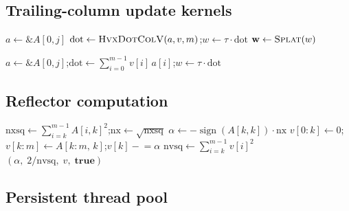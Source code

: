 \documentclass[11pt]{article}
\newcommand{\vt}{v^{\!\top}}
\begin{document}
\subsection{Trailing-column update kernels}

\begin{algorithm}[H]
\caption{\textsc{ApplyColHvx}$(A, v, \tau, j, m)$ --- $A[:,j] \mathrel{-}= \tau(\vt A[:,j])\,v$}
$a \gets \&A[0,j]$ 
$\text{dot} \gets \textsc{HvxDotColV}(a, v, m)$;\quad $w \gets \tau\cdot\text{dot}$\;
$\mathbf{w} \gets \textsc{Splat}(w)$ 
\end{algorithm}

\begin{algorithm}[H]
\caption{\textsc{ApplyColScalar}$(A, v, \tau, j, m)$ --- identical math, no HVX (fallback)}
$a \gets \&A[0,j]$;\quad $\text{dot} \gets \sum_{i=0}^{m-1} v[i]\,a[i]$;\quad $w \gets \tau\cdot\text{dot}$\;
\lForEach{$i \in [0,m)$}{$a[i] \mathrel{-}= w\,v[i]$}
\end{algorithm}

\subsection{Reflector computation}

\begin{algorithm}[H]
\caption{\textsc{ComputeReflector}$(A, m, k) \to (\alpha, \tau, v, \mathrm{valid})$}
$\mathrm{nxsq} \gets \sum_{i=k}^{m-1} A[i,k]^2$;\quad $\mathrm{nx} \gets \sqrt{\mathrm{nxsq}}$\;
$\alpha \gets -\operatorname{sign}(A[k,k])\cdot \mathrm{nx}$\;
$v[0{:}k] \gets 0$;\quad $v[k{:}m] \gets A[k{:}m,\,k]$;\quad $v[k] \mathrel{-}= \alpha$\;
$\mathrm{nvsq} \gets \sum_{i=k}^{m-1} v[i]^2$\;
\Return $(\alpha,\; 2/\mathrm{nvsq},\; v,\; \mathbf{true})$ \tcp*{$v[0{:}k]{=}0$ lets kernels run over $[0,m)$}
\end{algorithm}

\subsection{Persistent thread pool}
\end{document}
